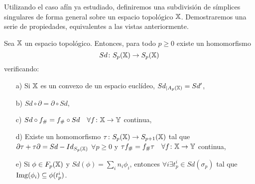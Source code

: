 Utilizando el caso afín ya estudiado, definiremos una subdivisión de símplices singulares de forma general sobre
un espacio topológico ${\mathbb X}$. Demostraremos una serie de propiedades, equivalentes a las vistas anteriormente.

\begin{proposition}
  Sea ${\mathbb X}$ un espacio topológico. Entonces, para todo $p \geq 0$ existe un homomorfismo
  \[Sd\colon S_p{({\mathbb X})} \to S_p{({\mathbb X})} \] verificando:
  \begin{itemize}
    \item[a)] Si ${\mathbb X}$ es un convexo de un espacio euclídeo, $Sd_{|A_p({\mathbb X})} = Sd'$,
    \item[b)] $Sd \circ \partial = \partial \circ Sd$,
    \item[c)] $Sd \circ f_\# = f_\# \circ Sd \quad \forall f \colon {\mathbb X} \to {\mathbb Y}$ continua,
    \item[d)] Existe un homomorfismo $\tau \colon S_{p}({\mathbb X}) \to S_{p+1}({\mathbb X})$ tal que ${\partial \tau + \tau \partial = Sd - Id_{S_p({\mathbb X})}}$
              $\forall p \geq 0$ y $\tau f_\# = f_\# \tau \quad \forall f \colon {\mathbb X} \to {\mathbb Y}$ continua,
    \item[e)] Si $\phi \in F_p({\mathbb X})$ y $Sd(\phi) = \sum_i n_i \phi_i$, entonces $\forall i \exists t_p^i \in Sd(\sigma_p)$ tal que
              $\operatorname{Img}(\phi_i) \subseteq \phi(t_p^i)$.

  \end{itemize}
\end{proposition}

